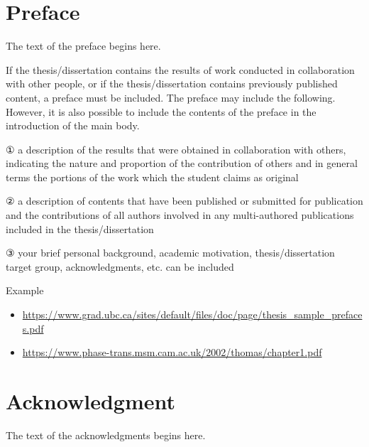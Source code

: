 \documentclass[11pt]{report}
\begin{document}

\newpage
\chapter*{Preface}
\normalsize
The text of the preface begins here. 

If the thesis/dissertation contains the results of work conducted in collaboration with other people, or if the thesis/dissertation contains previously published content, a preface must be included. The preface may include the following. However, it is also possible to include the contents of the preface in the introduction of the main body.\par

① a description of the results that were obtained in collaboration with others, indicating the nature and proportion of the contribution of others and in general terms the portions of the work which the student claims as original \par
② a description of contents that have been published or submitted for publication and the contributions of all authors involved in any multi-authored publications included in the thesis/dissertation \par
③ your brief personal background, academic motivation, thesis/dissertation target group, acknowledgments, etc. can be included 

\bigskip
Example
\begin{itemize}
\item\url{https://www.grad.ubc.ca/sites/default/files/doc/page/thesis_sample_prefaces.pdf}
\item\url{https://www.phase-trans.msm.cam.ac.uk/2002/thomas/chapter1.pdf}
\end{itemize}




\newpage
\chapter*{Acknowledgment}

The text of the acknowledgments begins here.

\renewcommand*\contentsname{Table of Contents}
\tableofcontents
\end{document}
